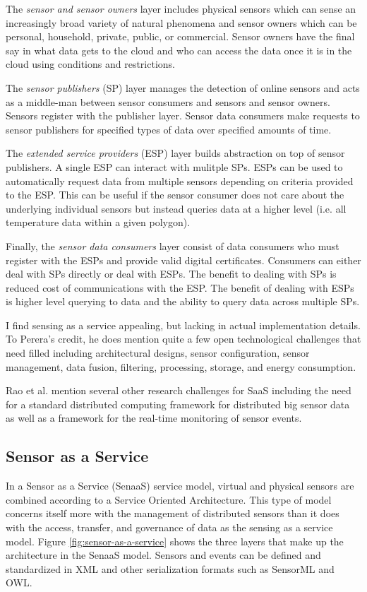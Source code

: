 \documentclass[]{article}
\begin{document}
The \textit{sensor and sensor owners} layer includes physical sensors which can sense an increasingly broad variety of natural phenomena and sensor owners which can be personal, household, private, public, or commercial. Sensor owners have the final say in what data gets to the cloud and who can access the data once it is in the cloud using conditions and restrictions.

The \textit{sensor publishers} (SP) layer manages the detection of online sensors and acts as a middle-man between sensor consumers and sensors and sensor owners. Sensors register with the publisher layer. Sensor data consumers make requests to sensor publishers for specified types of data over specified amounts of time.

The \textit{extended service providers} (ESP) layer builds abstraction on top of sensor publishers. A single ESP can interact with mulitple SPs. ESPs can be used to automatically request data from multiple sensors depending on criteria provided to the ESP. This can be useful if the sensor consumer does not care about the underlying individual sensors but instead queries data at a higher level (i.e. all temperature data within a given polygon).

Finally, the \textit{sensor data consumers} layer consist of data consumers who must register with the ESPs and provide valid digital certificates. Consumers can either deal with SPs directly or deal with ESPs. The benefit to dealing with SPs is reduced cost of communications with the ESP. The benefit of dealing with ESPs is higher level querying to data and the ability to query data across multiple SPs.

I find sensing as a service appealing, but lacking in actual implementation details. To Perera's credit, he does mention quite a few open technological challenges that need filled including architectural designs, sensor configuration, sensor management, data fusion, filtering, processing, storage, and energy consumption.

Rao et al.\cite{rao_cloud_2012} mention several other research challenges for SaaS including the need for a standard distributed computing framework for distributed big sensor data as well as a framework for the real-time monitoring of sensor events.

\subsection{Sensor as a Service} \label{ssec:sensor-as-a-service}
In a Sensor as a Service (SenaaS) \cite{alam_senaas_2010} service model, virtual and physical sensors are combined according to a Service Oriented Architecture. This type of model concerns itself more with the management of distributed sensors than it does with the access, transfer, and governance of data as the sensing as a service model\cite{zaslavsky_sensing_2013}. Figure \ref{fig:sensor-as-a-service} shows the three layers that make up the architecture in the SenaaS model. Sensors and events can be defined and standardized in XML and other serialization formats such as SensorML\cite{sensorml} and OWL\cite{dean_owl_2004}.
\end{document}
